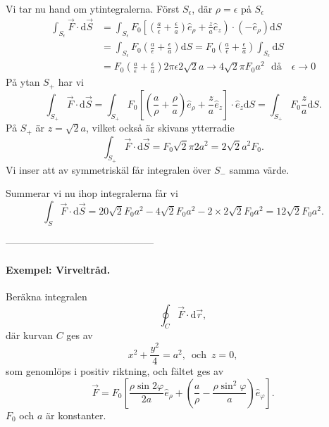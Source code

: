 \documentclass[%
oneside,                 %
final,                   %
10pt]{article}
\begin{document}
Vi tar nu hand om ytintegralerna.  Först $S_\epsilon$, där $\rho = \epsilon$ på $S_\epsilon$
\begin{align}
  \int_{S_\epsilon} \vec{F} \cdot \mbox{d}\vec{S} &= \int_{S_\epsilon}  F_0 \left[
\left(\frac{a}{\epsilon} + \frac{\epsilon}{a}\right) \hat{e}_{\rho} + 
\frac{z}{a}\hat{e}_{z}\right) \cdot \left(-\hat{e}_{\rho}\right) \mbox{d}S \nonumber \\
& = \int_{S_\epsilon} F_0 \left(\frac{a}{\epsilon} + \frac{\epsilon}{a}\right)
\mbox{d}S = F_0 \left(\frac{a}{\epsilon} + \frac{\epsilon}{a}\right)
\int_{S_\epsilon} \mbox{d}S \nonumber \\
&= F_0 \left(\frac{a}{\epsilon} + \frac{\epsilon}{a}\right) 2\pi \epsilon 2\sqrt{2}
a \to 4\sqrt{2} \pi F_0 a^2 \,\,\,\,\mbox{då }\,\,\,\,\epsilon \to 0
\end{align}
På ytan $S_+$  har vi
\begin{equation}
  \int_{S_+} \vec{F} \cdot \mbox{d}\vec{S} = \int_{S_+} F_0 \left[\left(\frac{a}{\rho}
+ \frac{\rho}{a} \right) \hat{e}_{\rho} + \frac{z}{a}\hat{e}_{z}\right]
\cdot \hat{e}_{z} \mbox{d}S = \int_{S_+} F_0 \frac{z}{a} \mbox{d}S.
\end{equation}
På $S_+$ är $z = \sqrt{2}a$, vilket också är skivans ytterradie
\begin{equation}
  \int_{S_+} \vec{F} \cdot \mbox{d}\vec{S} = F_0 \sqrt{2} \pi 2a^2 = 2\sqrt{2} a^2F_0.\end{equation}
Vi inser att av symmetriskäl får integralen över $S_-$ samma värde.

Summerar vi nu ihop integralerna får vi
\begin{equation}
  \int_S \vec{F} \cdot \mbox{d}\vec{S} = 20 \sqrt{2} F_0 a^2 - 4 \sqrt{2} F_0 a^2
- 2 \times 2 \sqrt{2} F_0 a^2 = 12\sqrt{2} F_0 a^2.
\end{equation}

---------------------------------------------

\paragraph{Exempel: Virveltråd.}


\vspace{3mm}


Beräkna integralen
\begin{equation}
  \oint_C \vec{F} \cdot \mbox{d}\vec{r},
\end{equation}
där kurvan $C$ ges av 
\begin{equation}
  x^2 + \frac{y^2}{4} = a^2,\,\,\,\mbox{och}\,\,\,z = 0,
\end{equation}
som genomlöps i positiv riktning, och fältet ges av
\begin{equation}
  \vec{F} = F_0 \left[\frac{\rho \sin 2\varphi}{2a} \hat{e}_{\rho}
+ \left(\frac{a}{\rho} - \frac{\rho \sin^2 \varphi}{a}\right)\hat{e}_{\varphi}
\right].
\end{equation}
$F_0$ och $a$ är konstanter.
\end{document}
